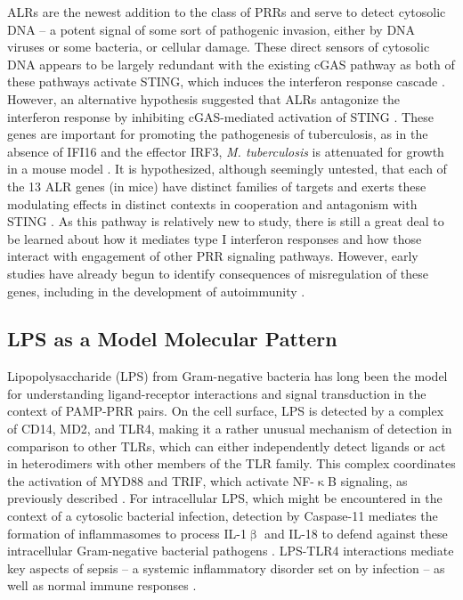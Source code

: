 ALRs are the newest addition to the class of PRRs and serve to detect cytosolic DNA -- a potent signal of some sort of pathogenic invasion, either by DNA viruses or some bacteria, or cellular damage. These direct sensors of cytosolic DNA appears to be largely redundant with the existing cGAS pathway as both of these pathways activate STING, which induces the interferon response cascade \citep{Gray2016}. However, an alternative hypothesis suggested that ALRs antagonize the interferon response by inhibiting cGAS\hyp{}mediated activation of STING \citep{Nakaya2017}. These genes are important for promoting the pathogenesis of tuberculosis, as in the absence of IFI16 and the effector IRF3, \textit{M. tuberculosis} is attenuated for growth in a mouse model \citep{Manzanillo2012}. It is hypothesized, although seemingly untested, that each of the 13 ALR genes (in mice) have distinct families of targets and exerts these modulating effects in distinct contexts in cooperation and antagonism with STING \citep{Nakaya2017}. As this pathway is relatively new to study, there is still a great deal to be learned about how it mediates type I interferon responses and how those interact with engagement of other PRR signaling pathways. However, early studies have already begun to identify consequences of misregulation of these genes, including in the development of autoimmunity \citep{Caneparo2018}.

\subsection{LPS as a Model Molecular Pattern}\label{lps}

Lipopolysaccharide (LPS) from Gram\hyp{}negative bacteria has long been the model for understanding ligand\hyp{}receptor interactions and signal transduction in the context of PAMP\hyp{}PRR pairs. On the cell surface, LPS is detected by a complex of CD14, MD2, and TLR4, making it a rather unusual mechanism of detection in comparison to other TLRs, which can either independently detect ligands or act in heterodimers with other members of the TLR family. This complex coordinates the activation of MYD88 and TRIF, which activate NF\hyp{}$\upkappa$B signaling, as previously described \citep{Miller2005, Beutler2000}. For intracellular LPS, which might be encountered in the context of a cytosolic bacterial infection, detection by Caspase\hyp{}11 mediates the formation of inflammasomes to process IL\hyp{}1$\upbeta$ and IL\hyp{}18 to defend against these intracellular Gram\hyp{}negative bacterial pathogens \citep{Wright1990, Triantafilou2002, Kawai1999, Vasudevan2022, Kayagaki2013, Rathinam2019, Shi2014}. LPS\hyp{}TLR4 interactions mediate key aspects of sepsis -- a systemic inflammatory disorder set on by infection -- as well as normal immune responses \citep{Freudenberg2008}.

